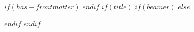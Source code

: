 $if(has-frontmatter)$
\frontmatter
$endif$
$if(title)$
$if(beamer)$
\frame{\titlepage}
$else$
\maketitle
$endif$
$endif$
